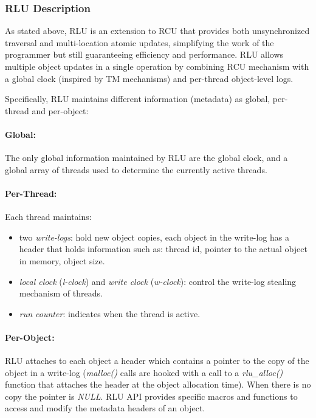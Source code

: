 \begin{refsection}
\subsubsection*{RLU Description}
\label{sec:member412}
As stated above, RLU is an extension to RCU that provides both unsynchronized
traversal and multi-location atomic updates, simplifying the work of the
programmer but still guaranteeing efficiency and performance.
%
RLU allows multiple object updates in a single operation by combining RCU
mechanism with a global clock (inspired by TM mechanisms) and per-thread
object-level logs.

Specifically, RLU maintains different information (metadata) as global,
\mbox{per-thread} and \mbox{per-object}:

\paragraph{Global:} The only global information maintained by RLU are the
global clock, and a global array of threads used to determine the currently
active threads.

\vspace{-10pt}
\paragraph{Per-Thread:} Each thread maintains:

\begin{itemize}
\item two \emph{write-logs}: hold new object copies, each object in the
  write-log has a header that holds information such as: thread id, pointer to
  the actual object in memory, object size.
\item \emph{local clock} (\emph{l-clock}) and \emph{write clock}
  (\emph{w-clock}): control the write-log stealing mechanism of threads.
\item \emph{run counter}: indicates when the thread is active.
\end{itemize}

\vspace{-10pt}
\paragraph{Per-Object:} RLU attaches to each object a header which contains a
pointer to the copy of the object in a write-log (\emph{malloc()} calls are
hooked with a call to a \emph{rlu\_alloc()} function that attaches the header
at the object allocation time).
%
When there is no copy the pointer is \emph{NULL}.
%
RLU API provides specific macros and functions to access and modify the
metadata headers of an object.
\\


\end{refsection}
